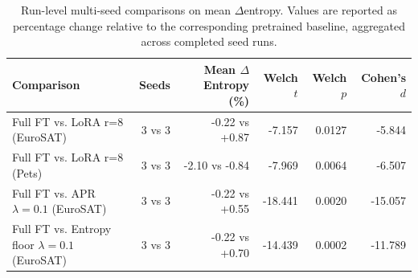\begin{table}[t]
\centering
\caption{Run-level multi-seed comparisons on mean $\Delta$entropy. Values are reported as percentage change relative to the corresponding pretrained baseline, aggregated across completed seed runs.}
\label{tab:multiseed}
\small
\begin{tabular}{lrrrrr}
\toprule
Comparison & Seeds & Mean $\Delta$Entropy (\%) & Welch $t$ & Welch $p$ & Cohen's $d$ \\
\midrule
Full FT vs. LoRA r=8 (EuroSAT) & 3 vs 3 & -0.22 vs +0.87 & -7.157 & 0.0127 & -5.844 \\
Full FT vs. LoRA r=8 (Pets) & 3 vs 3 & -2.10 vs -0.84 & -7.969 & 0.0064 & -6.507 \\
Full FT vs. APR $\lambda=0.1$ (EuroSAT) & 3 vs 3 & -0.22 vs +0.55 & -18.441 & 0.0020 & -15.057 \\
Full FT vs. Entropy floor $\lambda=0.1$ (EuroSAT) & 3 vs 3 & -0.22 vs +0.70 & -14.439 & 0.0002 & -11.789 \\
\bottomrule
\end{tabular}
\end{table}
